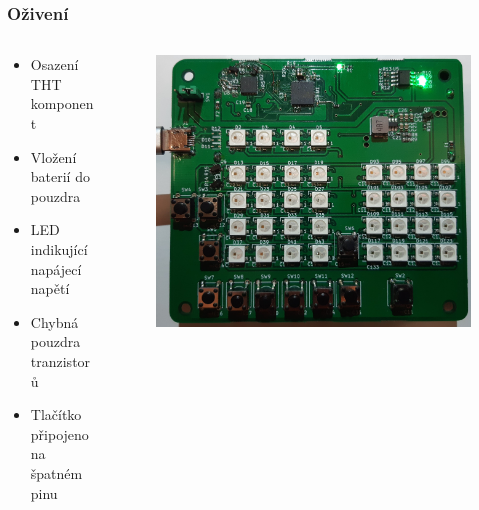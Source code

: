 \documentclass[%
  12pt,       				%
	t,                  %
	aspectratio=1610,   %
	unicode,						%
]{beamer}				    	%
\begin{document}
\begin{frame} 
	\frametitle{Oživení}
	\begin{columns}[T] 	
		\begin{column}{0.4\textwidth}		%
			\vspace{0.5cm}
			\begin{itemize}
				\item Osazení THT komponent
				\item Vložení baterií do pouzdra
				\item LED indikující napájecí napětí
				\item Chybná pouzdra tranzistorů
				\item Tlačítko připojeno na špatném pinu
			\end{itemize}
		\end{column}
		\begin{column}{0.6\textwidth}		%
			\begin{figure}%
				\centering
				\vspace{0.3cm}	              %
				\includegraphics[width=0.8\columnwidth]{obrazky/Verze0_zapnuto_nabito.jpg}
			\end{figure}%
		\end{column}
	\end{columns}
	
\end{frame}
\end{document}
